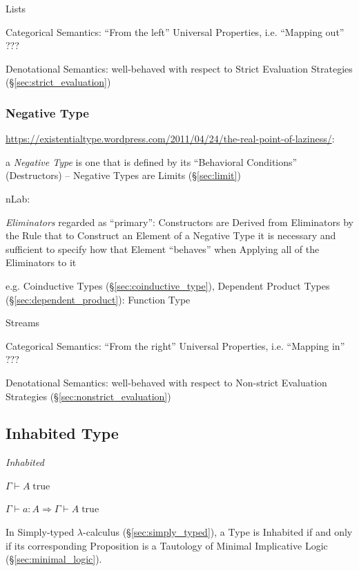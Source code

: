 Lists

Categorical Semantics: ``From the left'' Universal Properties, i.e.
``Mapping out'' ???

Denotational Semantics: well-behaved with respect to Strict Evaluation
Strategies (\S\ref{sec:strict_evaluation})



\subsubsection{Negative Type}\label{sec:negative_type}

\url{https://existentialtype.wordpress.com/2011/04/24/the-real-point-of-laziness/}:

a \emph{Negative Type} is one that is defined by its ``Behavioral
Conditions'' (Destructors) -- Negative Types are Limits
(\S\ref{sec:limit})

nLab:

\emph{Eliminators} regarded as ``primary'': Constructors are Derived
from Eliminators by the Rule that to Construct an Element of a
Negative Type it is necessary and sufficient to specify how that
Element ``behaves'' when Applying all of the Eliminators to it

e.g. Coinductive Types (\S\ref{sec:coinductive_type}), Dependent
Product Types (\S\ref{sec:dependent_product}): Function Type

Streams

Categorical Semantics: ``From the right'' Universal Properties, i.e.
``Mapping in'' ???

Denotational Semantics: well-behaved with respect to Non-strict
Evaluation Strategies (\S\ref{sec:nonstrict_evaluation})



\subsection{Inhabited Type}\label{sec:inhabited_type}

\emph{Inhabited}

$\Gamma \vdash A\;\mathrm{true}$

$\Gamma \vdash a:A \Rightarrow \Gamma \vdash A\;\mathrm{true}$

In Simply-typed $\lambda$-calculus (\S\ref{sec:simply_typed}), a Type
is Inhabited if and only if its corresponding Proposition is a
Tautology of Minimal Implicative Logic (\S\ref{sec:minimal_logic}).

